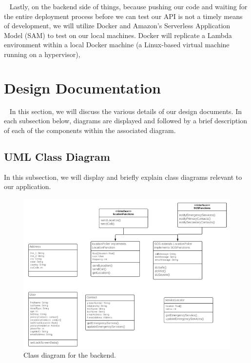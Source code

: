 \documentclass[10pt, a4paper]{article}
\begin{document}
\par ~ Lastly, on the backend side of things, because pushing our code and waiting for the entire deployment process before we can test our API is not a timely means of development, we will utilize Docker and Amazon's Serverless Application Model (SAM) \cite{five} to test on our local machines. Docker will replicate a Lambda environment within a local Docker machine (a Linux-based virtual machine running on a hypervisor), 

\section{Design Documentation}
\par ~ In this section, we will discuss the various details of our design documents. In each subsection below, diagrams are displayed and followed by a brief description of each of the components within the associated diagram.

\subsection{UML Class Diagram}
In this subsection, we will display and briefly explain class diagrams relevant to our application.
\begin{figure}[H]
  \centerline{
  	\includegraphics[scale=1]{diagrams/backend-class.png}
  }  
  \caption{Class diagram for the backend.}
\end{figure}
\end{document}
